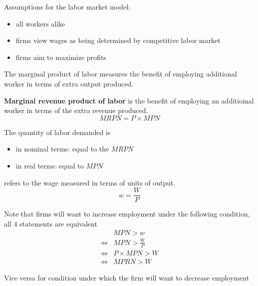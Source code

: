 Assumptions for the labor market model:
\begin{itemize}
    \item all workers alike
    \item firms view wages as being determined by competitive labor market
    \item firms aim to maximize profits
\end{itemize} 

The marginal product of labor measures the benefit of employing additional worker in terms of extra output produced. 

\begin{definition}
    \textbf{Marginal revenue product of labor} is the benefit of employing an additioinal worker in terms of the extra revenue produced. 
    \[
        MRPN = P \times MPN
    \]
\end{definition}

The quantity of labor demanded is 
\begin{itemize}
    \item in nominal terms: equal to the $MRPN$
    \item in real terms: equal to $MPN$
\end{itemize} 

\begin{definition}
     refers to the wage measured in terms of units of output.
    \[
        w = \frac{W}{P}
    \]
\end{definition}

\begin{remarks}
    Note that firms will want to increase employment under the following condition, all 4 statements are equivalent
    \begin{align*}
        & MPN > w  \\
        \iff & MPN > \frac{W}{P}  \\
        \iff & P \times MPN > W  \\
        \iff & MPRN > W 
    \end{align*}

    Vice versa for condition under which the firm will want to decrease employment
\end{remarks}


